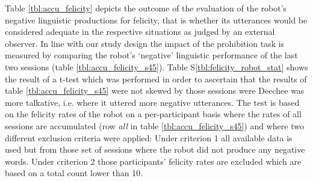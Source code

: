 \begin{screenonly}
Table \ref{tbl:accu_felicity} depicts the outcome of the evaluation of the robot's negative linguistic productions for felicity, that is whether
its utterances would be considered adequate in the respective situations as judged by an external observer. In line with our study design the impact
of the prohibition task is measured by comparing the robot's `negative' linguistic performance of the last two sessions (table \ref{tbl:accu_felicity_s45}).
Table S\ref{tbl:felicity_robot_stat} shows the result of a t-test which was performed in order to ascertain that the results of table \ref{tbl:accu_felicity_s45}
were not skewed by those sessions were Deechee was more talkative, i.e. where it uttered more negative utterances. The test is based on the felicity rates of the robot on a
per-participant basis where the rates of all sessions are accumulated (row \emph{all} in table \ref{tbl:accu_felicity_s45}) and where two different exclusion criteria
were applied: Under criterion 1 all available data is used but from those set of sessions where the robot did not produce any negative words. 
Under criterion 2 those participants' felicity rates are excluded which are based on a total count lower than 10.


\end{screenonly}
